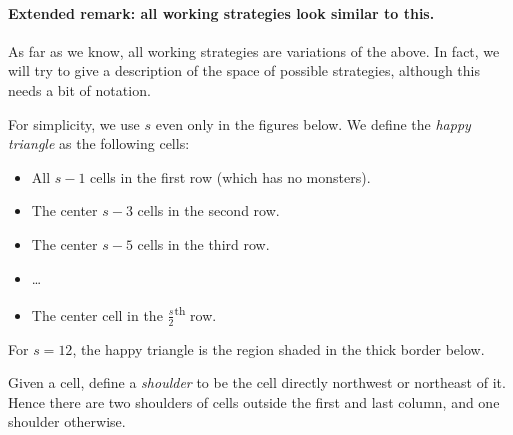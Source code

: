 \documentclass[11pt]{scrartcl}
\begin{document}
\paragraph{Extended remark: all working strategies look similar to this.}
As far as we know, all working strategies are variations of the above.
In fact, we will try to give a description of the space of possible strategies,
although this needs a bit of notation.

\begin{definition*}
For simplicity, we use $s$ even only in the figures below.
We define the \emph{happy triangle} as the following cells:
\begin{itemize}
  \item All $s-1$ cells in the first row (which has no monsters).
  \item The center $s-3$ cells in the second row.
  \item The center $s-5$ cells in the third row.
  \item \dots
  \item The center cell in the $\frac s2$\textsuperscript{th} row.
\end{itemize}
\end{definition*}
For $s=12$, the happy triangle is the region shaded in the thick border below.
\begin{center}
\end{center}
\begin{definition*}
  Given a cell, define a \emph{shoulder} to be the cell directly northwest or northeast of it.
  Hence there are two shoulders of cells outside the first and last column,
  and one shoulder otherwise.
\end{definition*}
\end{document}

